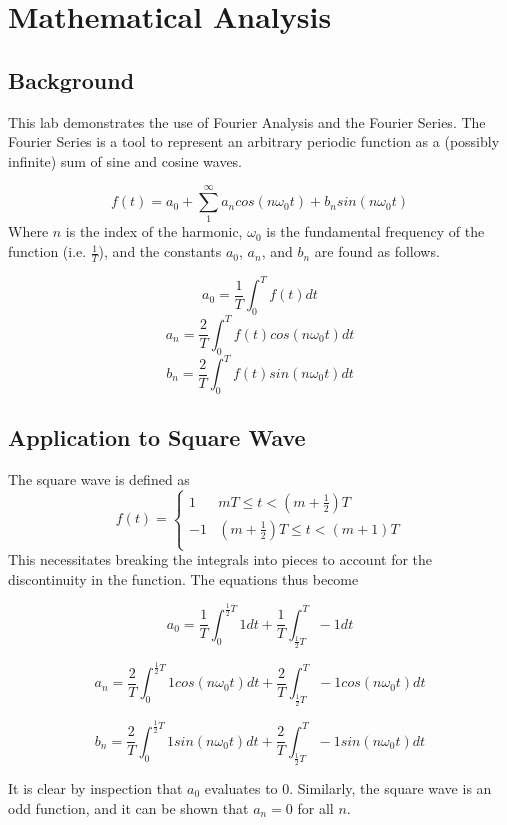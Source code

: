 \documentclass[a4paper,titlepage]{article}
\begin{document}
	\section{Mathematical Analysis}
	\subsection{Background}
	This lab demonstrates the use of Fourier Analysis and the Fourier Series. The Fourier Series is a tool to represent an arbitrary periodic function as a (possibly infinite) sum of sine and cosine waves.
	
	$$f(t) = a_0 + \sum_{1}^{\infty} a_n cos(n \omega_0 t) + b_n sin(n \omega_0 t)$$ 
	Where $n$ is the index of the harmonic, $\omega_0$ is the fundamental frequency of the function (i.e. $\frac{1}{T}$), and the constants $a_0$, $a_n$, and $b_n$ are found as follows.
	
	$$a_0 = \frac{1}{T} \int_{0}^{T}f(t)dt$$
	$$a_n = \frac{2}{T} \int_{0}^{T}f(t) cos(n \omega_0 t)dt$$
	$$b_n = \frac{2}{T} \int_{0}^{T}f(t) sin(n \omega_0 t)dt$$
	\subsection{Application to Square Wave}
	The square wave is defined as
	\[ f(t) =  \begin{cases}
	1 & mT \leq t < (m + \frac{1}{2})T \\
	-1 & (m + \frac{1}{2})T \leq t < (m + 1)T \\
	\end{cases}
	\]
	This necessitates breaking the integrals into pieces to account for the discontinuity in the function. The equations thus become
	
	$$a_0 = \frac{1}{T} \int_{0}^{\frac{1}{2}T}1dt + \frac{1}{T} \int_{\frac{1}{2}T}^{T} -1dt$$ 
	
	$$a_n = \frac{2}{T} \int_{0}^{\frac{1}{2}T}1cos(n \omega_0 t)dt + \frac{2}{T} \int_{\frac{1}{2}T}^{T}-1cos(n \omega_0 t)dt $$
	
	$$b_n = \frac{2}{T} \int_{0}^{\frac{1}{2}T}1sin(n \omega_0 t)dt + \frac{2}{T} \int_{\frac{1}{2}T}^{T} -1sin(n \omega_0 t)dt $$
	
	It is clear by inspection that $a_0$ evaluates to 0. Similarly, the square wave is an odd function, and it can be shown that $a_n = 0$ for all $n$.
	
	
\end{document}
